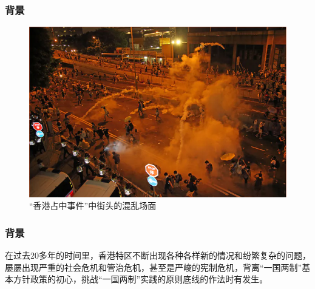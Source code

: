 \documentclass{ctexbeamer}
\begin{document}
    \begin{frame}
        \frametitle{背景}
        
        \begin{figure}
            \centering
            \includegraphics[scale=0.3]{pics/pic1.png}
            \caption{“香港占中事件”中街头的混乱场面}
        \end{figure}
    
    \end{frame}

    \begin{frame}
        \frametitle{背景}
    
        在过去20多年的时间里，香港特区不断出现各种各样新的情况和纷繁复杂的问题，屡屡出现严重的社会危机和管治危机，甚至是严峻的宪制危机，背离“一国两制”基本方针政策的初心，挑战“一国两制”实践的原则底线的作法时有发生。
    
    \end{frame}
\end{document}
